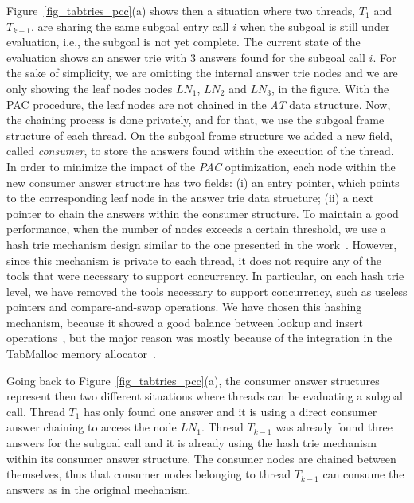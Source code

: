 \documentclass{llncs}
\begin{document}
Figure~\ref{fig_tabtries_pcc}(a) shows then a situation where two
threads, $T_1$ and $T_{k-1}$, are sharing the same subgoal entry call
$i$ when the subgoal is still under evaluation, i.e., the subgoal is
not yet complete. The current state of the evaluation shows an answer
trie with $3$ answers found for the subgoal call $i$. For the sake of
simplicity, we are omitting the internal answer trie nodes and we are
only showing the leaf nodes nodes $LN_1$, $LN_2$ and $LN_3$, in the
figure. With the PAC procedure, the leaf nodes are not chained in the
\emph{AT} data structure. Now, the chaining process is done privately,
and for that, we use the subgoal frame structure of each thread. On
the subgoal frame structure we added a new field, called
\emph{consumer}, to store the answers found within the execution of
the thread. In order to minimize the impact of the \emph{PAC}
optimization, each node within the new consumer answer structure has
two fields: (i) an entry pointer, which points to the corresponding
leaf node in the answer trie data structure; (ii) a next pointer to
chain the answers within the consumer structure. To maintain a good
performance, when the number of nodes exceeds a certain threshold, we
use a hash trie mechanism design similar to the one presented in the
work~\cite{Areias-ijpp15}. However, since this mechanism is private to
each thread, it does not require any of the tools that were necessary
to support concurrency. In particular, on each hash trie level, we
have removed the tools necessary to support concurrency, such as
useless pointers and compare-and-swap operations. We have chosen this
hashing mechanism, because it showed a good balance between lookup and
insert operations~\cite{Areias-ijpp15}, but the major reason was
mostly because of the integration in the TabMalloc memory
allocator~\cite{Areias-12b}.

Going back to Figure~\ref{fig_tabtries_pcc}(a), the consumer answer
structures represent then two different situations where threads can
be evaluating a subgoal call. Thread $T_1$ has only found one answer
and it is using a direct consumer answer chaining to access the node
$LN_1$. Thread $T_{k-1}$ was already found three answers for the
subgoal call and it is already using the hash trie mechanism within
its consumer answer structure. The consumer nodes are chained between
themselves, thus that consumer nodes belonging to thread $T_{k-1}$ can
consume the answers as in the original mechanism.
\end{document}
